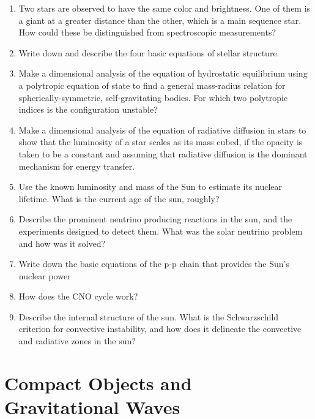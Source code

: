 \documentclass[10pt, oneside]{book}
\begin{document}
\begin{enumerate}[start=16]
    \item Two stars are observed to have the same color and brightness. One of them is a giant at a greater distance than the other, which is a main sequence star. How could these be distinguished from spectroscopic measurements?
    \item Write down and describe the four basic equations of stellar structure.
    \item Make a dimensional analysis of the equation of hydrostatic equilibrium using a polytropic equation of state to find a general mass-radius relation for spherically-symmetric, self-gravitating bodies. For which two polytropic indices is the configuration unstable?
    \item Make a dimensional analysis of the equation of radiative diffusion in stars to show that the luminosity of a star scales as its mass cubed, if the opacity is taken to be a constant and assuming that radiative diffusion is the dominant mechanism for energy transfer.
    \item Use the known luminosity and mass of the Sun to estimate its nuclear lifetime. What is the current age of the sun, roughly?
    \item Describe the prominent neutrino producing reactions in the sun, and the experiments designed to detect them. What was the solar neutrino problem and how was it solved?
    \item Write down the basic equations of the p-p chain that provides the Sun's nuclear power
    \item How does the CNO cycle work?
    \item Describe the internal structure of the sun. What is the Schwarzschild criterion for convective instability, and how does it delineate the convective and radiative zones in the sun?
\end{enumerate}

\section{Compact Objects and Gravitational Waves}
\end{document}
